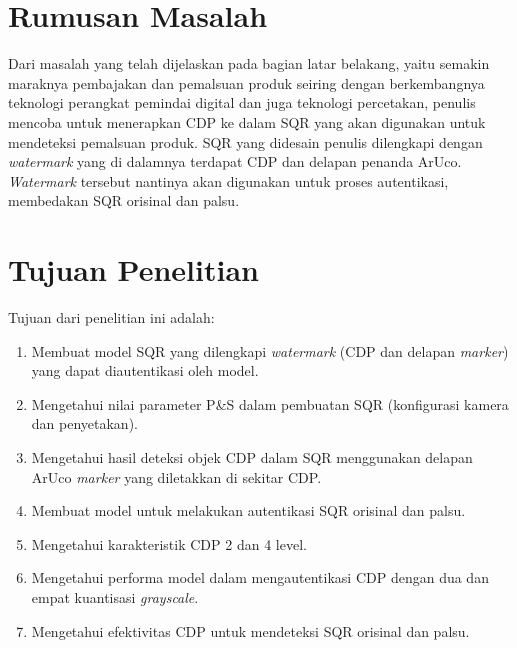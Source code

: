 \section{Rumusan Masalah}
Dari masalah yang telah dijelaskan pada bagian latar belakang, yaitu semakin maraknya pembajakan dan pemalsuan produk seiring dengan berkembangnya teknologi
perangkat pemindai digital dan juga teknologi percetakan, penulis mencoba untuk menerapkan CDP ke dalam SQR yang akan digunakan untuk mendeteksi pemalsuan
produk. SQR yang didesain penulis dilengkapi dengan \emph{watermark} yang di dalamnya terdapat CDP dan delapan penanda ArUco. \emph{Watermark} tersebut
nantinya akan digunakan untuk proses autentikasi, membedakan SQR orisinal dan palsu.

\section{Tujuan Penelitian}Tujuan dari penelitian ini adalah:
\begin{enumerate}
    \item Membuat model SQR yang dilengkapi \emph{watermark} (CDP dan delapan \emph{marker}) yang dapat diautentikasi oleh model.
    \item Mengetahui nilai parameter P\&S dalam pembuatan SQR (konfigurasi kamera dan penyetakan).
    \item Mengetahui hasil deteksi objek CDP dalam SQR menggunakan delapan ArUco \textit{marker} yang diletakkan di sekitar CDP.
    \item Membuat model untuk melakukan autentikasi SQR orisinal dan palsu.
    \item Mengetahui karakteristik CDP 2 dan 4 level.
    \item Mengetahui performa model dalam mengautentikasi CDP dengan dua dan empat kuantisasi \textit{grayscale}.
    \item Mengetahui efektivitas CDP untuk mendeteksi SQR orisinal dan palsu.
\end{enumerate}

